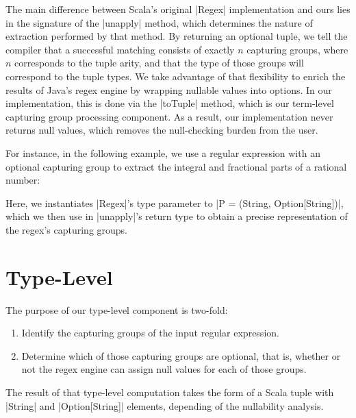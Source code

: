 The main difference between Scala's original |Regex| implementation and ours lies in the signature of the |unapply| method, which determines the nature of extraction performed by that method.
By returning an optional tuple, we tell the compiler that a successful matching consists of exactly $n$ capturing groups, where $n$ corresponds to the tuple arity, and that the type of those groups will correspond to the tuple types.
We take advantage of that flexibility to enrich the results of Java's regex engine by wrapping nullable values into options.
In our implementation, this is done via the |toTuple| method, which is our
term-level capturing group processing component.
As a result, our implementation never returns null values, which removes the null-checking burden from the user.

For instance, in the following example, we use a regular expression with an optional capturing group to extract the integral and fractional parts of a rational number:

\regexRational

\noindent
Here, we instantiates |Regex|'s type parameter to |P = (String, Option[String])|, which we then use in |unapply|'s return type to obtain a precise representation of the regex's capturing groups.

\section{Type-Level}
\label{sec:type-level}

The purpose of our type-level component is two-fold:

\begin{enumerate}
  \item Identify the capturing groups of the input regular expression.
  \item Determine which of those capturing groups are optional, that is, whether or not the regex engine can assign null values for each of those groups.
\end{enumerate}

\noindent
The result of that type-level computation takes the form of a Scala tuple with |String| and |Option[String]| elements, depending of the nullability analysis.

